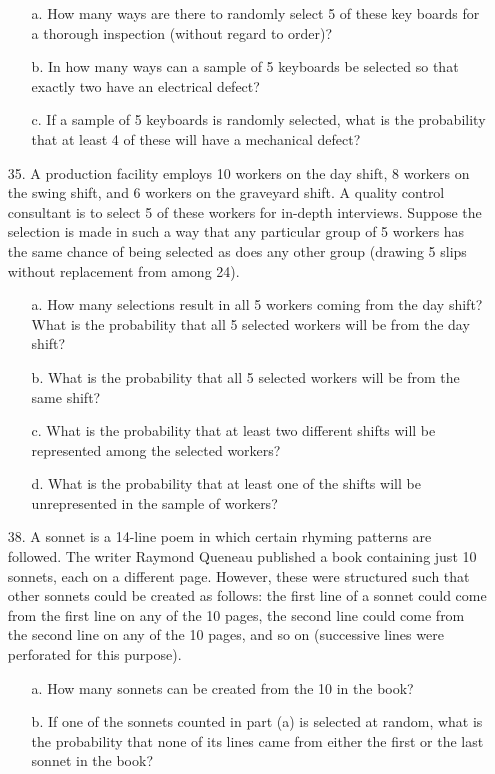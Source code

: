 \documentclass[letterpaper,12pt]{article}
\begin{document}
\begin{enumerate}
    \begin{enumerate}
      \item[a.]
        How many ways are there to randomly select 5 of these key boards for a thorough inspection (without regard to order)?
      \item[b.]
        In how many ways can a sample of 5 keyboards be selected so that exactly two have an electrical defect?
      \item[c.]
        If a sample of 5 keyboards is randomly selected, what is the probability that at least 4 of these will have a mechanical defect?
    \end{enumerate}
  \item[35.]
    A production facility employs 10 workers on the day shift, 8 workers on the swing shift, and 6 workers on the graveyard shift. A quality control consultant is to select 5 of these workers for in-depth interviews. Suppose the selection is made in such a way that any particular group of 5 workers has the same chance of being selected as does any other group (drawing 5 slips without replacement from among 24).
    \begin{enumerate}
      \item[a.]
        How many selections result in all 5 workers coming from the day shift? What is the probability that all 5 selected workers will be from the day shift?
      \item[b.]
        What is the probability that all 5 selected workers will be from the same shift?
      \item[c.]
        What is the probability that at least two different shifts will be represented among the selected workers?
      \item[d.]
        What is the probability that at least one of the shifts will be unrepresented in the sample of workers?
    \end{enumerate}
  \item[38.]
    A sonnet is a 14-line poem in which certain rhyming patterns are followed. The writer Raymond Queneau published a book containing just 10 sonnets, each on a different page. However, these were structured such that other sonnets could be created as follows: the first line of a sonnet could come from the first line on any of the 10 pages, the second line could come from the second line on any of the 10 pages, and so on (successive lines were perforated for this purpose).
    \begin{enumerate}
        \item[a.]
          How many sonnets can be created from the 10 in the book?
        \item[b.]
          If one of the sonnets counted in part (a) is selected at random, what is the probability that none of its lines came from either the first or the last sonnet in the book?
      \end{enumerate}
\end{enumerate}
\end{document}
